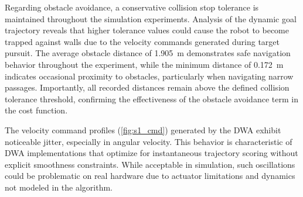 Regarding obstacle avoidance, a conservative collision stop tolerance is maintained throughout the simulation experiments. Analysis of the dynamic goal trajectory reveals that higher tolerance values could cause the robot to become trapped against walls due to the velocity commands generated during target pursuit. The average obstacle distance of 1.905~m demonstrates safe navigation behavior throughout the experiment, while the minimum distance of 0.172~m indicates occasional proximity to obstacles, particularly when navigating narrow passages. Importantly, all recorded distances remain above the defined collision tolerance threshold, confirming the effectiveness of the obstacle avoidance term in the cost function.

The velocity command profiles (\autoref{fig:s1_cmd}) generated by the DWA exhibit noticeable jitter, especially in angular velocity. This behavior is characteristic of DWA implementations that optimize for instantaneous trajectory scoring without explicit smoothness constraints. While acceptable in simulation, such oscillations could be problematic on real hardware due to actuator limitations and dynamics not modeled in the algorithm.